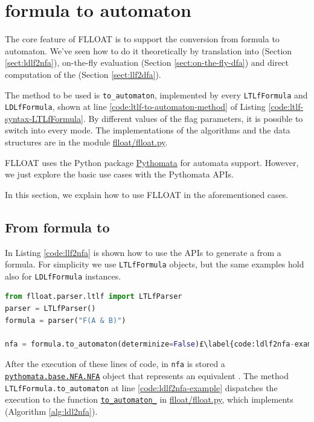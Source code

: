 \section{\LLf formula to automaton}
The core feature of FLLOAT is to support the conversion from \LLf formula to automaton. We've seen how to do it theoretically by translation into \NFA (Section \ref{sect:ldlf2nfa}), on-the-fly evaluation (Section \ref{sect:on-the-fly-dfa}) and direct computation of the \DFA (Section \ref{sect:llf2dfa}).

The method to be used is \texttt{to\_automaton}, implemented by every \texttt{LTLfFormula} and \texttt{LDLfFormula}, shown at line \ref{code:ltlf-to-automaton-method} of Listing \ref{code:ltlf-syntax-LTLfFormula}. By different values of the flag parameters, it is possible to switch into every mode. The implementations of the algorithms and the data structures are in the module \href{https://github.com/MarcoFavorito/flloat/blob/0.1.4/flloat/flloat.py}{flloat/flloat.py}.

FLLOAT uses the Python package \href{https://github.com/MarcoFavorito/pythomata}{Pythomata} for automata support. However, we just explore the basic use cases with the Pythomata APIs.

In this section, we explain how to use FLLOAT in the aforementioned cases.

\subsection{From \LLf formula to \NFA}\label{sect:flloat-llf2nfa}
In Listing \ref{code:llf2nfa} is shown how to use the APIs to generate a \NFA from a \LLf formula. For simplicity we use \texttt{LTLfFormula} objects, but the same examples hold also for \texttt{LDLfFormula} instances.

\begin{lstlisting}[language=Python, style=Python, escapechar = £, label={code:llf2nfa}, caption={From \LLf to \NFA}]
from flloat.parser.ltlf import LTLfParser
parser = LTLfParser()
formula = parser("F(A & B)")

nfa = formula.to_automaton(determinize=False)£\label{code:ldlf2nfa-example}£

\end{lstlisting}

After the execution of these lines of code, in \texttt{nfa} is stored a \href{https://github.com/MarcoFavorito/pythomata/blob/master/pythomata/base/NFA.py}{\texttt{pythomata.base.NFA.NFA}} object that represents an equivalent \NFA. The method \texttt{LTLfFormula.to\_automaton} at line \ref{code:ldlf2nfa-example} dispatches the execution to the function \href{https://github.com/MarcoFavorito/flloat/blob/0.1.4/flloat/flloat.py#L48-L161}{\texttt{to\_automaton\_}} in \href{https://github.com/MarcoFavorito/flloat/blob/0.1.4/flloat/flloat.py}{flloat/flloat.py}, which implements \LDLfToNFA (Algorithm \ref{alg:ldl2nfa}). 


